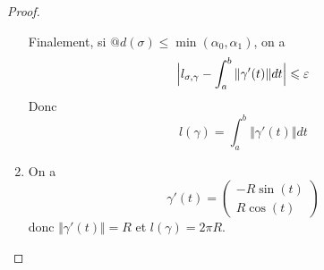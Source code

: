 \documentclass[12pt]{article}
\begin{document}
\begin{proof}
\begin{enumerate}
		Finalement, si $@d(\sigma)\leqslant\min(\alpha_{0},\alpha_{1})$, on a 
		\begin{equation}\Bigl\vert l_{\sigma,\gamma}-\int_{a}^{b}\Vert\gamma'(t)\Vert dt\Bigr\vert\leqslant\varepsilon\end{equation}
		Donc 
		\begin{equation}l(\gamma)=\int_{a}^{b}\Vert\gamma'(t)\Vert dt\end{equation}

		\item On a 
		\begin{equation}\gamma'(t)=\begin{pmatrix}
			-R\sin(t)\\
			R\cos(t)
		\end{pmatrix}\end{equation}
		donc $\Vert\gamma'(t)\Vert=R$ et $l(\gamma)=2\pi R$.
	\end{enumerate}
\end{proof}
\end{document}
